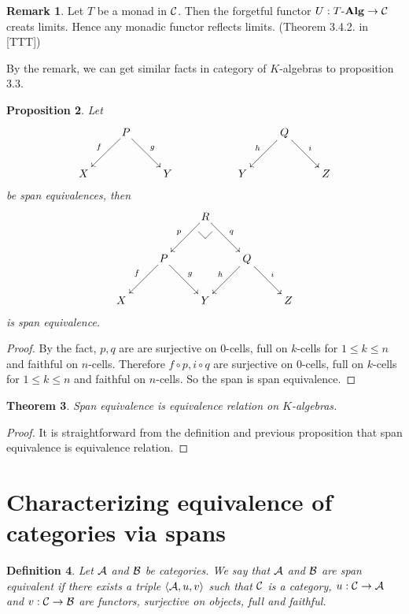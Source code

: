 \documentclass[12pt]{article}
\makeatletter
\theoremstyle{plain}
\newtheorem{theorem}{Theorem}[section]
\newtheorem{proposition}[theorem]{Proposition}
\newtheorem{definition}[theorem]{Definition}
\theoremstyle{definition}
\newtheorem{remark}[theorem]{Remark}
\newcommand{\pullbackmark}[2]{\save ;p+<.8pc,0pc>:(0,-1)::%
(#1) *{\phantom{Z}} %
;p+(#2)-(0,0) **@{-}%
;p-(#1)+(0,0) *{\phantom{Z}} **@{-} \restore}
\makeatother
\begin{document}
\begin{remark}
Let $T$ be a monad in ${\cal C}$. Then the forgetful functor $U:T \mathchar`- {\bf Alg} \rightarrow {\cal C}$ creats limits. Hence any monadic functor reflects limits. (Theorem 3.4.2. in [TTT])
\end{remark} 
 By the remark, we can get similar facts in category of $K$-algebras to proposition 3.3.


\begin{proposition}
Let
\[ \xymatrix{
 & \ar[ld]_f P \ar[rd]^g &  & & & \ar[ld]_h Q \ar[rd]^i & \\
X & & Y &  & Y & & Z 
} \]
be span equivalences, then
\[ \xymatrix{ 
 & & \ar[ld]_p R \pullbackmark{-1,1}{1,1} \ar[rd]^q & & \\
 & \ar[ld]_f P \ar[rd]^g &  & \ar[ld]_h Q \ar[rd]^i & \\
X & & Y & & Z 
} \]
is span equivalence.
\end{proposition}

\begin{proof}  By the fact, $p,q$ are are surjective on $0$-cells, full on $k$-cells for $1 \leq k \leq n$ and faithful on $n$-cells. Therefore $f \circ p , i \circ q$ are surjective on $0$-cells, full on $k$-cells for $1 \leq k \leq n$ and faithful on $n$-cells. So the span is span equivalence.
\end{proof}

\begin{theorem}
Span equivalence is equivalence relation on $K$-algebras.
\end{theorem}

\begin{proof} It is straightforward from the definition and previous proposition that span equivalence is equivalence relation.\end{proof}


\section{Characterizing equivalence of categories via spans}

\begin{definition}
Let ${\cal A}$ and ${\cal B}$ be categories. We say that ${\cal A}$ and ${\cal B}$ are \emph{span equivalent} if there exists a triple $\langle {\cal A}, u, v \rangle$ such that ${\cal C}$ is a category, $u: {\cal C} \rightarrow {\cal A}$ and $v: {\cal C} \rightarrow {\cal B}$ are functors, surjective on objects, full and faithful.
\end{definition}
\end{document}
